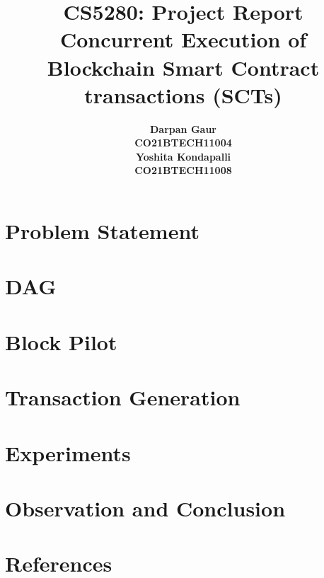\documentclass[12pt]{article}
\title{
    \textbf{CS5280: Project Report} \\
    \textbf{Concurrent Execution of Blockchain Smart Contract transactions (SCTs)} \\ 
}
\author{
    \begin{tabular}{c}
        \textbf{Darpan Gaur} \\
        \textbf{CO21BTECH11004}
    \end{tabular}
    \begin{tabular}{c}
        \textbf{Yoshita Kondapalli} \\
        \textbf{CO21BTECH11008}
    \end{tabular}
}
\date{}
\begin{document}
\maketitle

\hrulefill

\section{Problem Statement}

\section{DAG}

\section{Block Pilot}

\section{Transaction Generation}

\section{Experiments}

\section{Observation and Conclusion}

\section{References}
\end{document}
